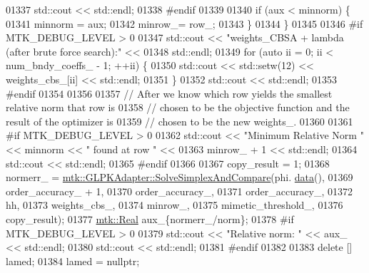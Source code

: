 \begin{DoxyCode}
{{01337       std::cout << std::endl;
01338 \textcolor{preprocessor}{      #endif}
01339 
01340       \textcolor{keywordflow}{if} (aux < minnorm) \{
01341         minnorm = aux;
01342         minrow\_= row\_;
01343       \}
01344     \}
01345 
01346 \textcolor{preprocessor}{    #if MTK\_DEBUG\_LEVEL > 0}
01347     std::cout << \textcolor{stringliteral}{"weights\_CBSA + lambda (after brute force search):"} <<
01348       std::endl;
01349     \textcolor{keywordflow}{for} (\textcolor{keyword}{auto} ii = 0; ii < num\_bndy\_coeffs\_ - 1; ++ii) \{
01350       std::cout << std::setw(12) << weights\_cbs\_[ii] << std::endl;
01351     \}
01352     std::cout << std::endl;
01353 \textcolor{preprocessor}{    #endif}
01354 
01356 
01357     \textcolor{comment}{// After we know which row yields the smallest relative norm that row is}
01358     \textcolor{comment}{// chosen to be the objective function and the result of the optimizer is}
01359     \textcolor{comment}{// chosen to be the new weights\_.}
01360 
01361 \textcolor{preprocessor}{    #if MTK\_DEBUG\_LEVEL > 0}
01362     std::cout << \textcolor{stringliteral}{"Minimum Relative Norm "} << minnorm << \textcolor{stringliteral}{" found at row "} <<
01363       minrow\_ + 1 << std::endl;
01364     std::cout << std::endl;
01365 \textcolor{preprocessor}{    #endif}
01366 
01367     copy\_result = 1;
01368     normerr\_ = \hyperlink{classmtk_1_1GLPKAdapter_a834480aca83e3c0d09fdab7fdb7e8a3f}{mtk::GLPKAdapter::SolveSimplexAndCompare}(phi.
      \hyperlink{classmtk_1_1DenseMatrix_a16b3ff56feb2658b9fc7147d1de4d8e7}{data}(),
01369                                                         order\_accuracy\_ + 1,
01370                                                         order\_accuracy\_,
01371                                                         order\_accuracy\_,
01372                                                         hh,
01373                                                         weights\_cbs\_,
01374                                                         minrow\_,
01375                                                         mimetic\_threshold\_,
01376                                                         copy\_result);
01377     \hyperlink{group__c01-roots_gac080bbbf5cbb5502c9f00405f894857d}{mtk::Real} aux\_\{normerr\_/norm\};
01378 \textcolor{preprocessor}{    #if MTK\_DEBUG\_LEVEL > 0}
01379     std::cout << \textcolor{stringliteral}{"Relative norm: "} << aux\_ << std::endl;
01380     std::cout << std::endl;
01381 \textcolor{preprocessor}{    #endif}
01382 
01383     \textcolor{keyword}{delete} [] lamed;
01384     lamed = \textcolor{keyword}{nullptr};
}}
\end{DoxyCode}
